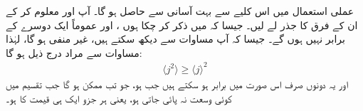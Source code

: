 عملی استعمال میں  اس کلیے سے بہت آسانی سے حاصل ہو گا۔ آپ  اور  معلوم کر کے ان کے فرق کا جذر لے لیں۔ جیسا کہ میں ذکر کر چکا ہوں ،  اور  عموماً ایک دوسرے کے برابر نہیں ہوں گے۔ جیسا کہ آپ مساوات  سے دیکھ سکتے ہیں،   غیر منفی ہو گا، لہٰذا مساوات  سے مراد درج ذیل ہو گا:
\begin{align}
 \langle j^2 \rangle \geq \langle j \rangle ^{2}
\end{align}
اور یہ دونوں صرف اس صورت میں برابر ہو سکتے ہیں جب  ہو، جو تب ممکن ہو گا جب تقسیم میں کوئی وسعت نہ پائی جاتی ہو،  یعنی ہر جزو ایک ہی قیمت کا ہو۔ 

